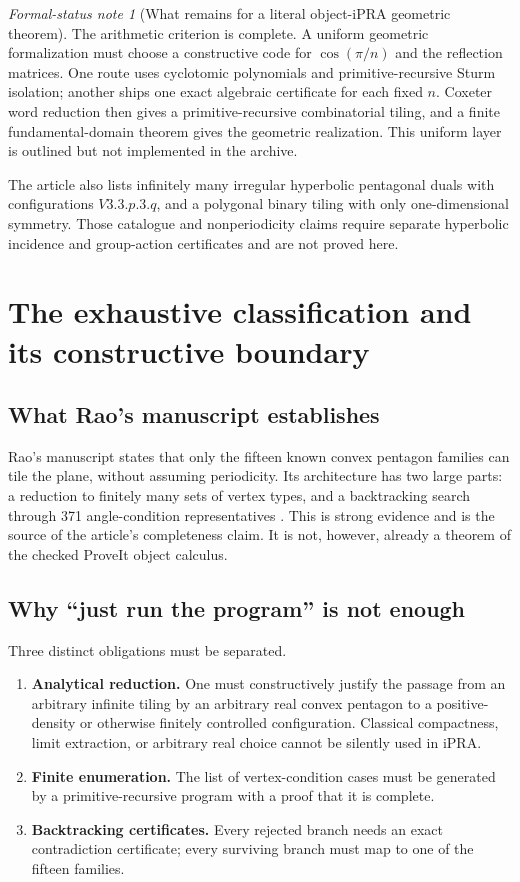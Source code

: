 \documentclass[11pt]{article}
\theoremstyle{remark}
\newtheorem{status}[theorem]{Formal-status note}
\newcommand{\ipra}{\mathrm{iPRA}}
\begin{document}
\begin{status}[What remains for a literal object-iPRA geometric theorem]
The arithmetic criterion is complete.  A uniform geometric formalization must
choose a constructive code for \(\cos(\pi/n)\) and the reflection matrices.
One route uses cyclotomic polynomials and primitive-recursive Sturm isolation;
another ships one exact algebraic certificate for each fixed \(n\).  Coxeter
word reduction then gives a primitive-recursive combinatorial tiling, and a
finite fundamental-domain theorem gives the geometric realization.  This
uniform layer is outlined but not implemented in the archive.
\end{status}

The article also lists infinitely many irregular hyperbolic pentagonal duals
with configurations \(V3.3.p.3.q\), and a polygonal binary tiling with only
one-dimensional symmetry.  Those catalogue and nonperiodicity claims require
separate hyperbolic incidence and group-action certificates and are not proved
here.

\section{The exhaustive classification and its constructive boundary}
\label{sec:rao}

\subsection{What Rao's manuscript establishes}

Rao's manuscript states that only the fifteen known convex pentagon families
can tile the plane, without assuming periodicity.  Its architecture has two
large parts: a reduction to finitely many sets of vertex types, and a
backtracking search through 371 angle-condition representatives
\cite{Rao2017}.  This is strong evidence and is the source of the article's
completeness claim.  It is not, however, already a theorem of the checked
ProveIt object calculus.

\subsection{Why ``just run the program'' is not enough}

Three distinct obligations must be separated.

\begin{enumerate}
\item \textbf{Analytical reduction.}  One must constructively justify the
passage from an arbitrary infinite tiling by an arbitrary real convex pentagon
to a positive-density or otherwise finitely controlled configuration.
Classical compactness, limit extraction, or arbitrary real choice cannot be
silently used in \(\ipra\).
\item \textbf{Finite enumeration.}  The list of vertex-condition cases must
be generated by a primitive-recursive program with a proof that it is complete.
\item \textbf{Backtracking certificates.}  Every rejected branch needs an
exact contradiction certificate; every surviving branch must map to one of the
fifteen families.
\end{enumerate}
\end{document}
